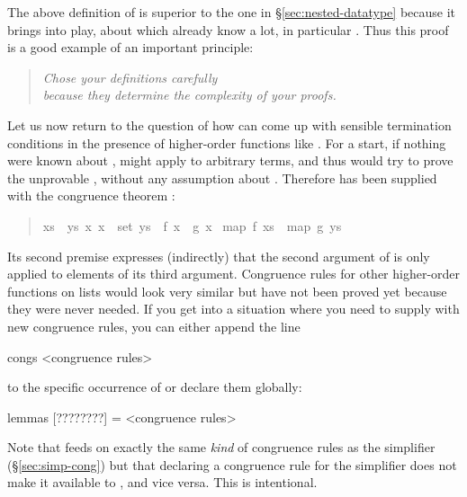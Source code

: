\begin{isabelle}
\begin{isamarkuptext}
The above definition of  is superior to the one in \S\ref{sec:nested-datatype}
because it brings  into play, about which already know a lot, in particular
.
Thus this proof is a good example of an important principle:
\begin{quote}
\emph{Chose your definitions carefully\\
because they determine the complexity of your proofs.}
\end{quote}

Let us now return to the question of how  can come up with sensible termination
conditions in the presence of higher-order functions like . For a start, if nothing
were known about ,  might apply  to arbitrary terms,
and thus  would try to prove the unprovable
, without any assumption about .
Therefore  has been supplied with the congruence theorem : 
\begin{quote}

\begin{isabelle}%
{\isasymlbrakk}\mbox{xs}\ {\isacharequal}\ \mbox{ys}{\isacharsemicolon}\ {\isasymAnd}\mbox{x}{\isachardot}\ \mbox{x}\ {\isasymin}\ set\ \mbox{ys}\ {\isasymLongrightarrow}\ \mbox{f}\ \mbox{x}\ {\isacharequal}\ \mbox{g}\ \mbox{x}{\isasymrbrakk}\isanewline
{\isasymLongrightarrow}\ map\ \mbox{f}\ \mbox{xs}\ {\isacharequal}\ map\ \mbox{g}\ \mbox{ys}
\end{isabelle}%

\end{quote}
Its second premise expresses (indirectly) that the second argument of  is only applied
to elements of its third argument. Congruence rules for other higher-order functions on lists would
look very similar but have not been proved yet because they were never needed.
If you get into a situation where you need to supply  with new congruence
rules, you can either append the line
\begin{ttbox}
congs <congruence rules>
\end{ttbox}
to the specific occurrence of  or declare them globally:
\begin{ttbox}
lemmas [????????] = <congruence rules>
\end{ttbox}

Note that  feeds on exactly the same \emph{kind} of
congruence rules as the simplifier (\S\ref{sec:simp-cong}) but that
declaring a congruence rule for the simplifier does not make it
available to , and vice versa. This is intentional.%
\end{isamarkuptext}%
\end{isabelle}%
